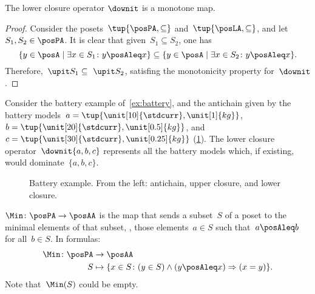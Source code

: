 \begin{lemma}
  The lower closure operator $\downit$ is a monotone map.
\end{lemma}

\begin{proof}
  Consider the posets~$\tup{\posPA,\subseteq}$ and~$\tup{\posLA,\subseteq}$, and let~$S_1,S_2\in \posPA$. It is clear that given~$S_1\subseteq S_2$, one has
  \begin{equation}
    \{y\in \posA\mid \exists x\in S_1\colon y\posAleq x\} \subseteq \{y\in \posA\mid \exists x\in S_2\colon y\posAleq x\}.
  \end{equation}
  Therefore,~$\upit S_1\subseteq \ \upit S_2$, satisfing the monotonicity property for~$\downit$.
\end{proof}



\begin{example}
  Consider the battery example of~\cref{ex:battery}, and the antichain given by the battery models~$a=\tup{\unit[10]{\stdcurr},\unit[1]{kg}}$,~$b=\tup{\unit[20]{\stdcurr},\unit[0.5]{kg}}$, and~$c=\tup{\unit[30]{\stdcurr},\unit[0.25]{kg}}$ (\cref{fig:examplebatt}).
  The lower closure operator~$\downit\{a,b,c\}$ represents all the battery models which, if existing, would dominate~$\{a,b,c\}$.

\end{example}
\begin{figure}[h!]
  \begin{center}
  \end{center}
  \caption{Battery example. From the left: antichain, upper closure, and lower closure.
  }
  \label{fig:examplebatt}
\end{figure}


\begin{definition}[Min]
  \label{def:Min}
  $\Min \colon \posPA \to \posAA$ is the map that sends a subset~$S$ of a poset to the minimal elements of that subset, \ie , those elements~$a \in S$ such that~$a \posAleq b$ for all~$b \in S$. In formulas:
  \begin{equation*}
    \begin{aligned}
      \Min \colon \posPA &\to \posAA\\
      S&\mapsto \{ x\in S\colon (y\in S)\wedge(y\posAleq x)\Rightarrow (x=y)\}.
    \end{aligned}
  \end{equation*}
  Note that~$\Min(S)$ could be empty.
\end{definition}

